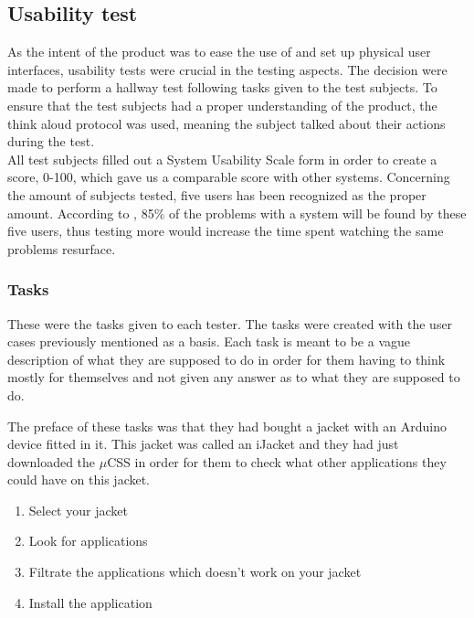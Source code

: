 		\subsection{Usability test}
		As the intent of the product was to ease the use of and set up physical user interfaces, usability tests were crucial in the testing aspects. The decision were made to perform a hallway test following tasks given to the test subjects. To ensure that the test subjects had a proper understanding of the product, the think aloud protocol was used, meaning the subject talked about their actions during the test. \\
		\newline
		All test subjects filled out a System Usability Scale form in order to create a score, 0-100, which gave us a comparable score with other systems. Concerning the amount of subjects tested, five users has been recognized as the proper amount. According to \cite{Nielsen}, 85\% of the problems with a system will be found by these five users, thus testing more would increase the time spent watching the same problems resurface.

		\subsubsection{Tasks}
			These were the tasks given to each tester. The tasks were created with the user cases previously mentioned as a basis. Each task is meant to be a vague description of what they are supposed to do in order for them having to think mostly for themselves and not given any answer as to what they are supposed to do.

			The preface of these tasks was that they had bought a jacket with an Arduino device fitted in it. This jacket was called an iJacket and they had just downloaded the $\mu$CSS in order for them to check what other applications they could have on this jacket.

			\vspace{6 mm}
			\begin{enumerate}
			 \item Select your jacket
			 \item Look for applications
			 \item Filtrate the applications which doesn't work on your jacket
			 \item Install the application
			\end{enumerate}
			\vspace{6 mm}

